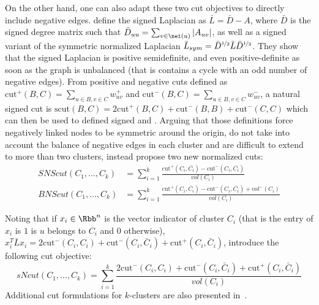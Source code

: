 On the other hand, one can also adapt these two cut objectives to directly include negative edges.
\Textcite{Luca10} define the signed Laplacian as $\bar{L} = \bar{D} - A$, where $\bar{D}$ is the
signed degree matrix such that $\bar{D}_{uu} = \sum_{v\in \nei(u)} |A_{uv}|$, as well as a signed
variant of the symmetric normalized Laplacian $\bar{L}_{sym}  = \bar{D}^{\nicefrac{1}{2}} \bar{L}
\bar{D}^{\nicefrac{1}{2}}$. They show that the signed Laplacian is positive semidefinite, and
even positive-definite as soon as the graph is unbalanced (that is contains a cycle with an odd
number of negative edges). From positive and negative cuts defined as $\mathrm{cut}^+(B, C) =
\sum_{u\in B, v\in C} w^+_{uv}$ and $\mathrm{cut}^-(B, C) = \sum_{u\in B, v\in C} w^-_{uv}$, a
natural signed cut is $\mathrm{scut}(B, C) = 2\mathrm{cut}^+(B, C) + \mathrm{cut}^-(B, B) +
\mathrm{cut}^-(C, C)$ which can then be used to defined signed \rcut{} and \ncut{}. Arguing that those
definitions force negatively linked nodes to be symmetric around the origin, do not take into
account the balance of negative edges in each cluster and are difficult to extend to more than two
clusters, \textcite{SignedEmbedding15} instead propose two new normalized cuts:
\begin{align*}
  SNScut(C_1, \ldots, C_k) &= \sum_{i=1}^k
  \frac{\mathrm{cut}^+(C_i, \bar{C_i})-\mathrm{cut}^-(C_i, \bar{C_i})}{vol(C_i)}  \\
  BNScut(C_1, \ldots, C_k) &= \sum_{i=1}^k
  \frac{\mathrm{cut}^+(C_i, \bar{C_i})-\mathrm{cut}^-(C_i, \bar{C_i})+vol^-(C_i)}{vol(C_i)}
\end{align*}

Noting that if $x_i\in\Rbb^n$ is the vector indicator of cluster $C_i$ (that is the \uth{} entry of
$x_i$ is $1$ is $u$ belongs to $C_i$ and $0$ otherwise), $x_i^T\bar{L}x_i = 2\mathrm{cut}^-(C_i,
C_i) + \mathrm{cut}^-(C_i, \bar{C}_i) + \mathrm{cut}^+(C_i, \bar{C}_i)$,
\textcite{mSemanticWordCC17} introduce the following cut objective:
\begin{equation*}
  sNcut(C_1, \ldots, C_k) = \sum_{i=1}^k
  \frac{2\mathrm{cut}^-(C_i, C_i) + \mathrm{cut}^-(C_i, \bar{C}_i) + \mathrm{cut}^+(C_i, \bar{C}_i)}{vol(C_i)}
\end{equation*}
Additional cut formulations for $k$-clusters are also presented in~\autocite{moreSignedCut12}.

